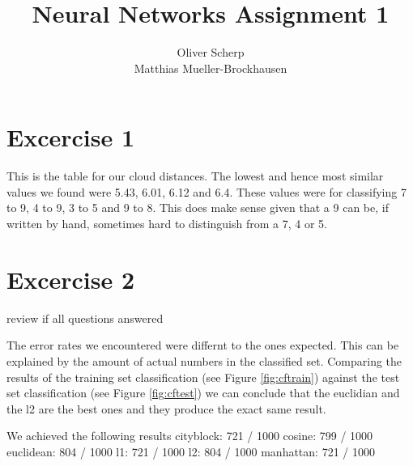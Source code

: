 \documentclass{article}
\begin{document}
\title{Neural Networks Assignment 1}
\author{Oliver Scherp\\Matthias Mueller-Brockhausen}
\maketitle
\lstset{
  basicstyle=\ttfamily,
  keywordstyle=\bfseries,
  language=Java,
  frame=single,
  aboveskip=11pt,
  belowskip=11pt,
  breaklines=true,
  breakatwhitespace=false,
  showspaces=false,
  showstringspaces=false,
  numbers=left,
  stepnumber=1,    
  firstnumber=1,
  numberfirstline=true
}
\section{Excercise 1}
This is the table for our cloud distances.
The lowest and hence most similar values we found were 5.43, 6.01, 6.12 and 6.4.
These values were for classifying 7 to 9, 4 to 9, 3 to 5 and 9 to 8.
This does make sense given that a 9 can be, if written by hand, sometimes hard to distinguish from a 7, 4 or 5.


\section{Excercise 2}
review if all questions answered

The error rates we encountered were differnt to the ones expected. This can be explained by the amount of  actual numbers in the classified set.
Comparing the results of the training set classification (see Figure \ref{fig:cftrain}) against the test set classification (see Figure \ref{fig:cftest}) we can conclude that the euclidian and the l2 are the best ones and they produce the exact same result.

We achieved the following results
cityblock: 721 / 1000
cosine: 799 / 1000
euclidean: 804 / 1000
l1: 721 / 1000
l2: 804 / 1000
manhattan: 721 / 1000
\end{document}
